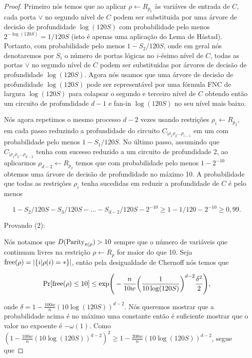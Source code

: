 \begin{proof}
	Primeiro nós temos que ao aplicar $\rho \leftarrow R_{p_{1}}$ às variáves de entrada de $C$, cada porta $\lor$ no segundo nível de $C$ podem ser substituida por uma árvore de decisão de profundidade $\log(120S)$ com probabilidade pelo menos $2^{-\log(120S)} = 1/120S$ (isto é apenas uma aplicação do Lema de Håstad). Portanto, com probabilidade pelo menos $1 - S_{2}/120S$, onde em geral nós denotaremos por $S_{i}$ o número de portas lógicas no $i$-ésimo nível de $C$, todas as portas $\lor$ no segundo nível de $C$ podem ser substituidas por árvores de decisão de profundidade $\log(120S)$. Agora nós usamos que uma árvore de decisão de profundidade $\log(120S)$ pode ser representável por uma fórmula FNC de largura $\log(120S)$ para colapsar o segundo e terceiro nível de $C$ obtendo então um circuito de profundidade $d - 1$ e fan-in $\log(120S)$ no seu nível mais baixo.
	
	Nós agora repetimos o mesmo processo $d - 2$ vezes usando restrições $\rho_{i} \leftarrow R_{p_{2}}$, em cada passo reduzindo a profundidade do circuito $C_{\lvert \rho_{1}\rho_{2}\dots\rho_{i - 1}}$ em um com probabilidade pelo menos $1 - S_{1}/120S$. No último passo, assumindo que $C_{\lvert \rho_{1}\rho_{2}\dots\rho_{d - 2}}$ tenha com sucesso reduzido a um circuito de profundidade 2, ao aplicarmos $\rho_{d - 2} \leftarrow R_{p_{2}}$ temos que com probabilidade pelo menos $1 - 2^{-10}$ obtemos uma árvore de decisão de profundidade no máximo 10. A probabilidade que todas as restrições $\rho_{i}$ tenha sucedidas em reduzir a profundidade de $C$ é pelo menos
	
	\begin{equation*}
		1 - S_{2}/120S - S_{3}/120S - \dots - S_{d - 2}/120S - 2^{-10} \geq 1 - 1/120 - 2^{-10} \geq 0,99.
	\end{equation*}
	
	Provando (2):
	
	Nós notamos que $D(\text{Parity}_{n \lvert \rho}) > 10$ sempre que o número de variáveis que continuam livres na restrição $\rho \leftarrow R_{p}$ for maior do que 10. Seja $\text{free}(\rho) = \lvert \{i \lvert \rho(i) = *\} \rvert$, então pela desigualdade de Chernoff nós temos que
	
	\begin{equation*}
		\Pr[\text{free}(\rho) \leq 10] \leq \text{exp} \Bigg( -\frac{n}{10w} \bigg(\frac{1}{10\log(120S)} \bigg)^{d - 2}\frac{\delta^{2}}{2} \Bigg),
	\end{equation*}
		
	onde $\delta = 1 - \frac{100w}{n}(10\log(120S))^{d - 2}$. Nós queremos mostrar que a probabilidade acima é no máximo uma constante então é suficiente mostrar que o valor no expoente é $-\omega(1)$.  Como $(1 - \frac{100w}{n}(10\log(120S))^{d - 2})^{2} \geq 1 - \frac{200w}{n}(10\log(120S))^{d - 2}$, segue que
	

\end{proof}
